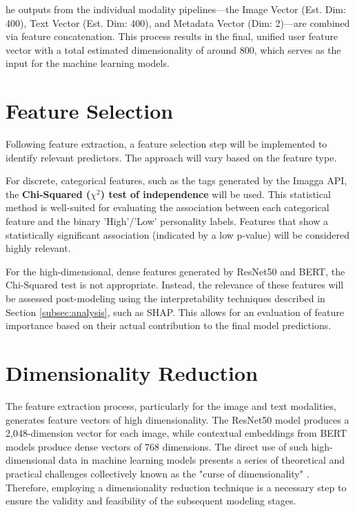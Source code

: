 he outputs from the individual modality pipelines—the Image Vector (Est. Dim: 400), Text Vector (Est. Dim: 400), and Metadata Vector (Dim: 2)—are combined via feature concatenation. This process results in the final, unified user feature vector with a total estimated dimensionality of around 800, which serves as the input for the machine learning models.

\section{Feature Selection}
Following feature extraction, a feature selection step will be implemented to identify relevant predictors. The approach will vary based on the feature type.

For discrete, categorical features, such as the tags generated by the Imagga API, the \textbf{Chi-Squared ($\chi^2$) test of independence} will be used. This statistical method is well-suited for evaluating the association between each categorical feature and the binary 'High'/'Low' personality labels. Features that show a statistically significant association (indicated by a low p-value) will be considered highly relevant.

For the high-dimensional, dense features generated by ResNet50 and BERT, the Chi-Squared test is not appropriate. Instead, the relevance of these features will be assessed post-modeling using the interpretability techniques described in Section \ref{subsec:analysis}, such as SHAP. This allows for an evaluation of feature importance based on their actual contribution to the final model predictions.

\section{Dimensionality Reduction}
\label{sec:rationale_pca}
The feature extraction process, particularly for the image and text modalities, generates feature vectors of high dimensionality. The ResNet50 model produces a 2,048-dimension vector for each image, while contextual embeddings from BERT models produce dense vectors of 768 dimensions. The direct use of such high-dimensional data in machine learning models presents a series of theoretical and practical challenges collectively known as the "curse of dimensionality" \citep{bellman1961, bellman1966}. Therefore, employing a dimensionality reduction technique is a necessary step to ensure the validity and feasibility of the subsequent modeling stages.

